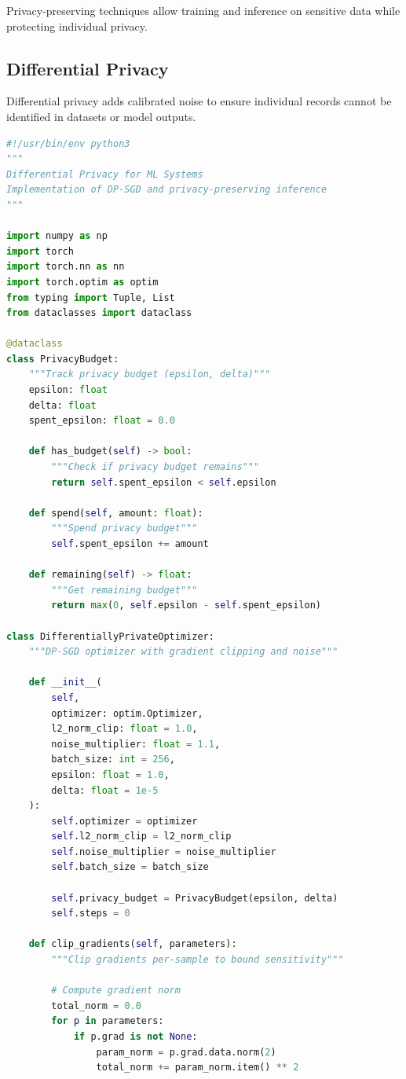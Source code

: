 Privacy-preserving techniques allow training and inference on sensitive data while protecting individual privacy.

\subsection{Differential Privacy}

Differential privacy adds calibrated noise to ensure individual records cannot be identified in datasets or model outputs.

\begin{lstlisting}[language=Python, caption=Differential Privacy Implementation]
#!/usr/bin/env python3
"""
Differential Privacy for ML Systems
Implementation of DP-SGD and privacy-preserving inference
"""

import numpy as np
import torch
import torch.nn as nn
import torch.optim as optim
from typing import Tuple, List
from dataclasses import dataclass

@dataclass
class PrivacyBudget:
    """Track privacy budget (epsilon, delta)"""
    epsilon: float
    delta: float
    spent_epsilon: float = 0.0

    def has_budget(self) -> bool:
        """Check if privacy budget remains"""
        return self.spent_epsilon < self.epsilon

    def spend(self, amount: float):
        """Spend privacy budget"""
        self.spent_epsilon += amount

    def remaining(self) -> float:
        """Get remaining budget"""
        return max(0, self.epsilon - self.spent_epsilon)

class DifferentiallyPrivateOptimizer:
    """DP-SGD optimizer with gradient clipping and noise"""

    def __init__(
        self,
        optimizer: optim.Optimizer,
        l2_norm_clip: float = 1.0,
        noise_multiplier: float = 1.1,
        batch_size: int = 256,
        epsilon: float = 1.0,
        delta: float = 1e-5
    ):
        self.optimizer = optimizer
        self.l2_norm_clip = l2_norm_clip
        self.noise_multiplier = noise_multiplier
        self.batch_size = batch_size

        self.privacy_budget = PrivacyBudget(epsilon, delta)
        self.steps = 0

    def clip_gradients(self, parameters):
        """Clip gradients per-sample to bound sensitivity"""

        # Compute gradient norm
        total_norm = 0.0
        for p in parameters:
            if p.grad is not None:
                param_norm = p.grad.data.norm(2)
                total_norm += param_norm.item() ** 2


\end{lstlisting}

